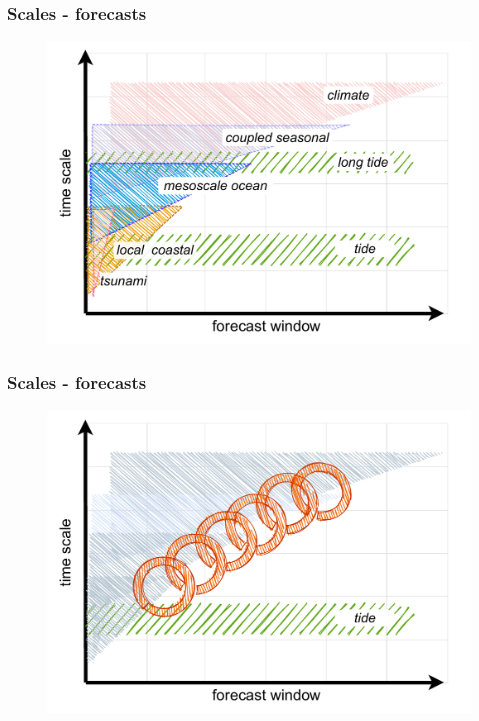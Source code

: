 \begin{frame}
\frametitle{Scales - forecasts}
    \begin{figure}      
     \includegraphics[height=\textheight]{figures/diagrams/scales.pdf}
    \end{figure} 
\end{frame}
\begin{frame}
\frametitle{Scales - forecasts}
    \begin{figure}      
     \includegraphics[height=\textheight]{figures/diagrams/scales_with_chain.pdf}
    \end{figure} 
\end{frame}

